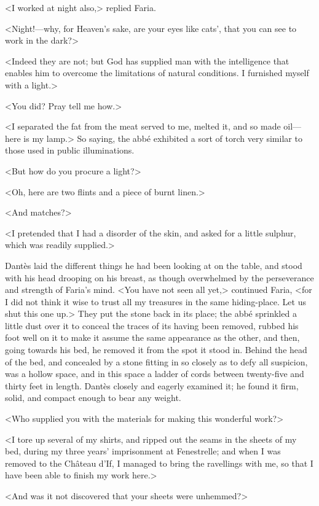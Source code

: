  <I worked at night also,> replied Faria. 

 <Night!—why, for Heaven's sake, are your eyes like cats', that you can see to work in the dark?> 

 <Indeed they are not; but God has supplied man with the intelligence that enables him to overcome the limitations of natural conditions. I furnished myself with a light.> 

 <You did? Pray tell me how.> 

 <I separated the fat from the meat served to me, melted it, and so made oil—here is my lamp.> So saying, the abbé exhibited a sort of torch very similar to those used in public illuminations. 

 <But how do you procure a light?> 

 <Oh, here are two flints and a piece of burnt linen.> 

 <And matches?> 

 <I pretended that I had a disorder of the skin, and asked for a little sulphur, which was readily supplied.> 

 Dantès laid the different things he had been looking at on the table, and stood with his head drooping on his breast, as though overwhelmed by the perseverance and strength of Faria's mind.  <You have not seen all yet,> continued Faria, <for I did not think it wise to trust all my treasures in the same hiding-place. Let us shut this one up.> They put the stone back in its place; the abbé sprinkled a little dust over it to conceal the traces of its having been removed, rubbed his foot well on it to make it assume the same appearance as the other, and then, going towards his bed, he removed it from the spot it stood in. Behind the head of the bed, and concealed by a stone fitting in so closely as to defy all suspicion, was a hollow space, and in this space a ladder of cords between twenty-five and thirty feet in length. Dantès closely and eagerly examined it; he found it firm, solid, and compact enough to bear any weight. 

 <Who supplied you with the materials for making this wonderful work?> 

 <I tore up several of my shirts, and ripped out the seams in the sheets of my bed, during my three years' imprisonment at Fenestrelle; and when I was removed to the Château d'If, I managed to bring the ravellings with me, so that I have been able to finish my work here.> 

 <And was it not discovered that your sheets were unhemmed?> 


